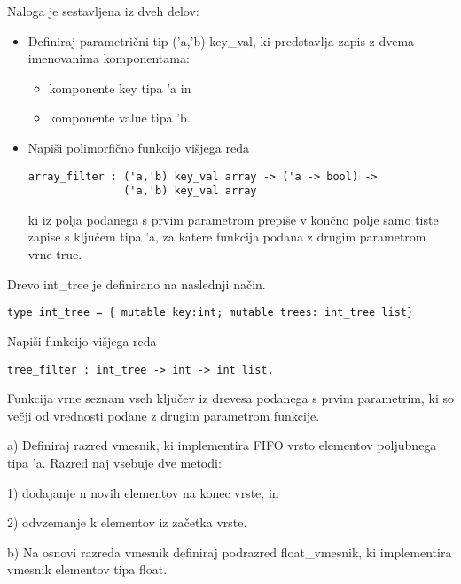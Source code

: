 \begin{ex}
Naloga je sestavljena iz dveh delov:
\begin{itemize}
\item Definiraj parametri\v cni tip ('a,'b) key\_val, ki predstavlja zapis z dvema imenovanima komponentama: 
	\begin{itemize}
       \item komponente key tipa 'a in
       \item komponente value tipa 'b. 
	\end{itemize}
\item Napi\v si polimorfi\v cno funkcijo vi\v sjega reda

\begin{verbatim}
array_filter : ('a,'b) key_val array -> ('a -> bool) ->  
               ('a,'b) key_val array
\end{verbatim}

ki iz polja podanega s prvim parametrom prepi\v se v kon\v cno polje samo tiste zapise s klju\v cem tipa 'a, za katere funkcija podana z drugim parametrom vrne true. \end{itemize}  

\end{ex} \begin{ex}
Drevo int\_tree je definirano na naslednji na\v cin.

\begin{verbatim}
type int_tree = { mutable key:int; mutable trees: int_tree list}
\end{verbatim}

Napi\v si funkcijo vi\v sjega reda 

\begin{verbatim}
tree_filter : int_tree -> int -> int list.
\end{verbatim}
Funkcija vrne seznam vseh klju\v cev iz drevesa podanega s prvim parametrim, ki so ve\v cji od vrednosti podane z drugim parametrom funkcije.  


\end{ex} \begin{ex}
a) Definiraj razred vmesnik, ki implementira FIFO vrsto elementov poljubnega tipa 'a. Razred naj  vsebuje dve metodi: 

       1) dodajanje n novih elementov na konec vrste, in
       
       2) odvzemanje k elementov iz za\v cetka vrste.

b) Na osnovi razreda vmesnik definiraj podrazred float\_vmesnik, ki implementira vmesnik elementov tipa float.



\end{ex}
